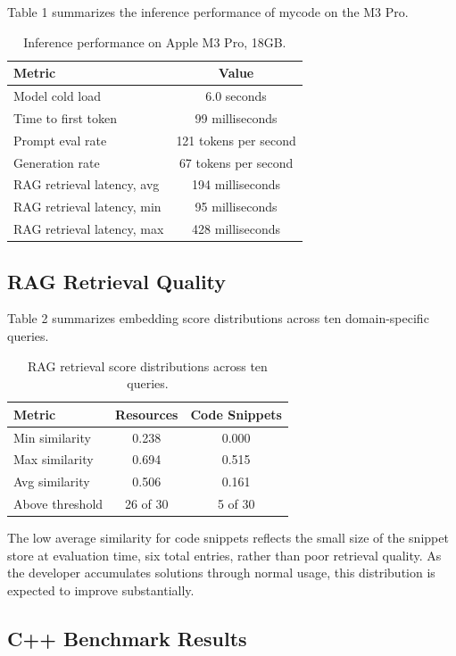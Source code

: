\documentclass[11pt,twocolumn]{article}
\begin{document}
Table 1 summarizes the inference performance of mycode on the M3 Pro.

\begin{table}[h]
\centering
\caption{Inference performance on Apple M3 Pro, 18GB.}
\begin{tabular}{lc}
\toprule
\textbf{Metric} & \textbf{Value} \\
\midrule
Model cold load & 6.0 seconds \\
Time to first token & 99 milliseconds \\
Prompt eval rate & 121 tokens per second \\
Generation rate & 67 tokens per second \\
RAG retrieval latency, avg & 194 milliseconds \\
RAG retrieval latency, min & 95 milliseconds \\
RAG retrieval latency, max & 428 milliseconds \\
\bottomrule
\end{tabular}
\end{table}

\subsection{RAG Retrieval Quality}

Table 2 summarizes embedding score distributions across ten domain-specific
queries.

\begin{table}[h]
\centering
\caption{RAG retrieval score distributions across ten queries.}
\begin{tabular}{lcc}
\toprule
\textbf{Metric} & \textbf{Resources} & \textbf{Code Snippets} \\
\midrule
Min similarity & 0.238 & 0.000 \\
Max similarity & 0.694 & 0.515 \\
Avg similarity & 0.506 & 0.161 \\
Above threshold & 26 of 30 & 5 of 30 \\
\bottomrule
\end{tabular}
\end{table}

The low average similarity for code snippets reflects the small size of the
snippet store at evaluation time, six total entries, rather than poor retrieval
quality. As the developer accumulates solutions through normal usage, this
distribution is expected to improve substantially.

\subsection{C++ Benchmark Results}
\end{document}
